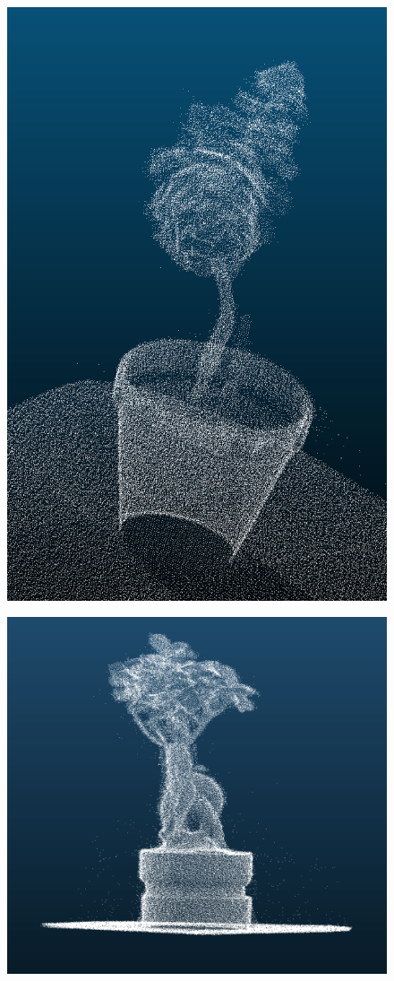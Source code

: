 \documentclass[runningheads,a4paper]{llncs}
\begin{document}
\begin{figure}
\begin{minipage}{.5\textwidth}
  \includegraphics[width=.6\linewidth]{easy-tree-sample.png}
  \label{fig:easy-tree-sample}
\end{minipage}
\begin{minipage}{.5\textwidth}
  \centering
  \includegraphics[width=1\linewidth]{complex-tree-sample.png}
  \label{fig:complex-tree-sample}
\end{minipage}
\end{figure}
\end{document}
